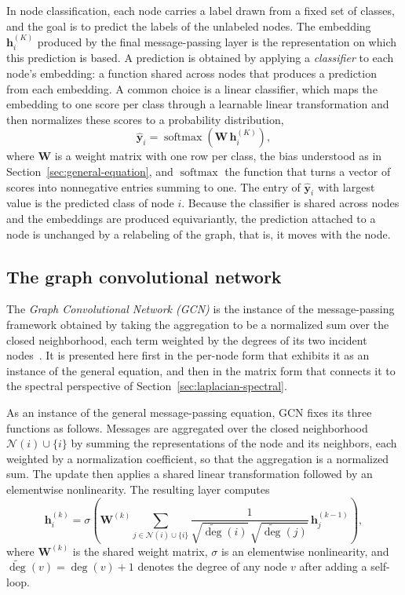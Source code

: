In node classification, each node carries a label drawn from a fixed set of
classes, and the goal is to predict the labels of the unlabeled nodes. The
embedding $\mathbf{h}_i^{(K)}$ produced by the final message-passing layer is the
representation on which this prediction is based. A prediction is obtained by
applying a \textit{classifier} to each node's embedding: a function shared across nodes 
that produces a prediction from each embedding. A common choice is a linear classifier, 
which maps the embedding to one score per class through a learnable linear transformation 
and then normalizes these scores to a probability distribution,
\begin{equation}
  \hat{\mathbf{y}}_i = \operatorname{softmax}\!\left(
    \mathbf{W}\,\mathbf{h}_i^{(K)}
  \right),
  \label{eq:node-classifier}
\end{equation}
where $\mathbf{W}$ is a weight matrix with one row per class, the bias understood
as in Section~\ref{sec:general-equation}, and $\operatorname{softmax}$ the
function that turns a vector of scores into nonnegative entries summing to one.
The entry of $\hat{\mathbf{y}}_i$ with largest value is the predicted class of
node $i$. Because the classifier is shared across nodes and the embeddings are
produced equivariantly, the prediction attached to a node is unchanged by a
relabeling of the graph, that is, it moves with the node.

\subsection{The graph convolutional network}
\label{sec:gcn}

The \textit{Graph Convolutional Network (GCN)} is the instance of the message-passing
framework obtained by taking the aggregation to be a normalized sum over the closed
neighborhood, each term weighted by the degrees of its two incident
nodes~\cite{kipf2017}. It is presented here first in the per-node form that
exhibits it as an instance of the general equation, and then in the matrix form
that connects it to the spectral perspective of
Section~\ref{sec:laplacian-spectral}.

As an instance of the general message-passing equation, GCN fixes its 
three functions as follows. Messages are aggregated over the 
closed neighborhood $\mathcal{N}(i)\cup\{i\}$ by summing the representations
 of the node and its neighbors, each weighted by a normalization coefficient, so that
the aggregation is a normalized sum. The update then applies a shared linear transformation 
followed by an elementwise nonlinearity. The resulting layer computes
\begin{equation}
  \mathbf{h}_i^{(k)} = \sigma\!\left(
    \mathbf{W}^{(k)}
    \sum_{j \in \mathcal{N}(i) \cup \{i\}}
      \frac{1}{\sqrt{\widetilde{\deg}(i)}\,\sqrt{\widetilde{\deg}(j)}}\,
      \mathbf{h}_j^{(k-1)}
  \right),
  \label{eq:gcn-node}
\end{equation}
where $\mathbf{W}^{(k)}$ is the shared weight matrix,
$\sigma$ is an elementwise nonlinearity, and
$\widetilde{\deg}(v)=\deg(v)+1$ denotes the degree of any node $v$
after adding a self-loop.


